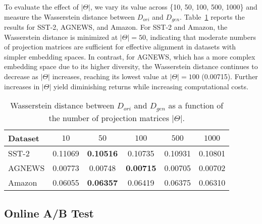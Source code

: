 To evaluate the effect of $|\Theta|$, we vary its value across \{10, 50, 100, 500, 1000\} and measure the Wasserstein distance between $D_{ori}$ and $D_{gen}$. Table~\ref{tab:theta_analysis} reports the results for SST-2, AGNEWS, and Amazon.
For SST-2 and Amazon, the Wasserstein distance is minimized at $|\Theta| = 50$, indicating that moderate numbers of projection matrices are sufficient for effective alignment in datasets with simpler embedding spaces. In contrast, for AGNEWS, which has a more complex embedding space due to its higher diversity, the Wasserstein distance continues to decrease as $|\Theta|$ increases, reaching its lowest value at $|\Theta| = 100$ (0.00715). Further increases in $|\Theta|$ yield diminishing returns while increasing computational costs.




\begin{table}[htbp]
\centering
\caption{Wasserstein distance between $D_{ori}$ and $D_{gen}$ as a function of the number of projection matrices $|\Theta|$.}
\label{tab:theta_analysis}
\begin{tabular}{lccccc}
\toprule
\textbf{Dataset} & \textbf{$10$} & \textbf{$50$} & \textbf{$100$} & \textbf{$500$} & \textbf{$1000$} \\
\midrule
SST-2 & 0.11069 & \textbf{0.10516} & 0.10735 & 0.10931 & 0.10801 \\
AGNEWS & 0.00773 & 0.00748 & \textbf{0.00715} & 0.00705 & 0.00702 \\
Amazon & 0.06055 & \textbf{0.06357} & 0.06419 & 0.06375 & 0.06310 \\
\bottomrule
\end{tabular}
\end{table}


\subsection{Online A/B Test}

